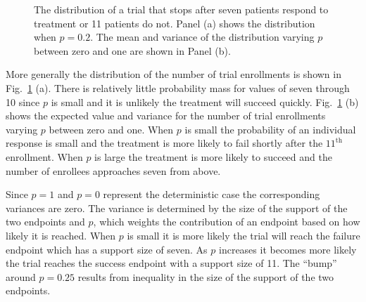 \documentclass[review]{elsarticle}
\begin{document}
\begin{figure}[bp!]
\centering
{}
\hfill
{}
\caption{
The distribution of a trial that stops after seven patients respond to treatment
or 11 patients do not. Panel (a) shows the distribution when
$p = 0.2$. The mean and variance of the distribution varying $p$ 
between zero and one are shown in Panel (b).
}
\label{fig:exp-and-var}
\end{figure}

More generally the distribution of the number of trial enrollments is shown in 
Fig.~\ref{fig:exp-and-var} (a). There is relatively little probability mass
for values of seven through 10 since $p$ is small and it is unlikely 
the treatment will succeed quickly.
Fig.~\ref{fig:exp-and-var} (b) shows the expected value and variance for the
number of trial enrollments varying $p$ between zero and one. When $p$ is
small the probability of an individual response is small and the treatment
is more likely to fail shortly after the $11^{\text{th}}$ enrollment.
When $p$ is large the treatment is more likely to succeed and the number of 
enrollees approaches seven from above. 

Since $p=1$ and $p=0$ represent the deterministic
case the corresponding variances are zero. The variance is
determined by the size of the support of the two endpoints and $p$, which 
weights the contribution of an endpoint based on how likely it is reached.
When $p$ is small it is more likely the trial will reach the failure endpoint
which has a support size of seven. As $p$ increases it becomes more likely the
trial reaches the success endpoint with a support size of 11.
The ``bump'' around $p=0.25$ results from inequality in the size of the
support of the two endpoints.
\end{document}
